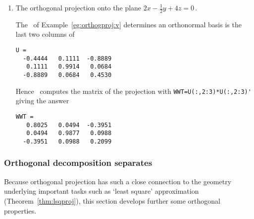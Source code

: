 \begin{example}
\begin{enumerate}
\item The orthogonal projection onto the plane \(2x-\frac12y+4z=0\)\,.
\begin{solution} 
The \svd\ of  Example~\ref{eg:orthogproj:v}  determines an orthonormal basis is the last two columns of
\begin{verbatim}
U =
  -0.4444   0.1111  -0.8889
   0.1111   0.9914   0.0684
  -0.8889   0.0684   0.4530
\end{verbatim}
Hence \script\ computes the matrix of the projection with \verb|WWT=U(:,2:3)*U(:,2:3)'| giving the answer
\setbox\ajrqrbox\hbox{}%
\marginpar{\usebox{\ajrqrbox\\[2ex]}}%
\begin{verbatim}
WWT =
   0.8025   0.0494  -0.3951
   0.0494   0.9877   0.0988
  -0.3951   0.0988   0.2099
\end{verbatim}
\end{solution}
\end{enumerate}
\end{example}










\subsubsection{Orthogonal decomposition separates}

\begin{comment}
\pooliv{p.384} does not seem to define the orthogonal space~\(\WW^\perp\).
\larsvii{p.260--8} has quick development and nice problems---defines orthogonal subspaces but probably confusing for us to do so here as only interested in orthog complement.
\nakos{pp.516--22} has straightforward development.
\end{comment}


Because orthogonal projection has such a close connection to the geometry underlying important tasks such as `least square' approximation (Theorem~\ref{thm:lsqproj}), this section develops further some orthogonal properties.

